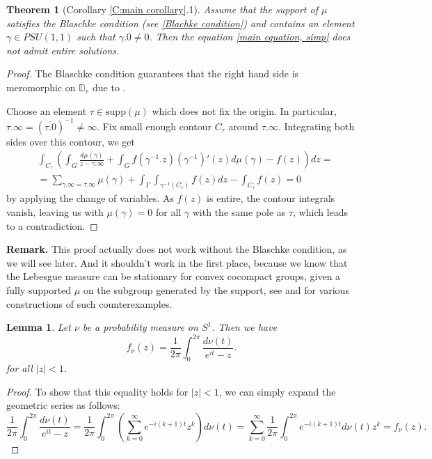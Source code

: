 \documentclass[11pt]{article}
\newtheorem{theorem}{Theorem}[section]
\newtheorem{lemma}{Lemma}[section]
\begin{document}
\begin{theorem}[Corollary \ref{C:main corollary}.1]
	\label{entire solutions}
	Assume that the support of $\mu$ satisfies the Blaschke condition (see \eqref{Blachke condition}) and contains an element $\gamma \in PSU(1,1)$ such that $\gamma.0 \ne 0$. Then the equation \eqref{main equation, simp} does not admit entire solutions.
\end{theorem}
\begin{proof}
	The Blaschke condition guarantees that the right hand side is meromorphic on $\mathbb{D}_e$ due to \cite[Proposition 4.2.14]{Shapiro1968}.
	
	Choose an element $\tau \in \text{supp}(\mu)$ which does not fix the origin. In particular, $\tau.\infty = (\overline{\tau.0})^{-1} \ne \infty$. Fix small enough contour $C_\tau$ around $\tau.\infty$. Integrating both sides over this contour, we get
	\[
	\begin{aligned}
		& \int_{C_\tau}\left( \int_G \frac{d\mu(\gamma)}{z - \gamma.\infty}  + \int_G f(\gamma^{-1}.z)(\gamma^{-1})'(z)  d\mu(\gamma) - f(z) \right) dz = \\ 
		&= \sum_{\gamma.\infty = \tau.\infty} \mu(\gamma) + \int_\Gamma \int_{\gamma^{-1}(C_\tau)} f(z) dz - \int_{C_\tau} f(z)  = 0
	\end{aligned}
	\]
	by applying the change of variables. As $f(z)$ is entire, the contour integrals vanish, leaving us with $\mu(\gamma) = 0$ for all $\gamma$ with the same pole as $\tau$, which leads to a contradiction.
\end{proof}

\textbf{Remark.} This proof actually does not work without the Blaschke condition, as we will see later. And it shouldn't work in the first place, because we know that the Lebesgue measure can be stationary for convex cocompact groups, given a fully supported $\mu$ on the subgroup generated by the support, see \cite{furstenberg71} and \cite{10.1215/00127094-2020-0058} for various constructions of such counterexamples.


\begin{lemma}
	\label{T:Cauchy transform}
	Let $\nu$ be a probability measure on $S^1$. Then we have
	\begin{equation}
		\label{E:Cauchy transform}
		f_\nu(z) = \frac{1}{2 \pi} \int_0^{2 \pi} \dfrac{d \nu(t)}{e^{i t} - z}.
	\end{equation}
	for all $|z| < 1$.
\end{lemma}
\begin{proof}
	To show that this equality holds for $|z| < 1$, we can simply expand the geometric series as follows:
	\[
	\frac{1}{2 \pi} \int_0^{2 \pi} \dfrac{d \nu(t)}{e^{i t} - z} = \frac{1}{2 \pi} \int_0^{2 \pi} \left( \sum_{k=0}^\infty e^{-i (k+1) t} z^k \right)  d\nu(t) = \sum_{k=0}^\infty \frac{1}{2 \pi} \int_0^{2 \pi} e^{-i (k+1) t} d \nu(t) z^k = f_\nu(z).
	\]
\end{proof}
\end{document}
